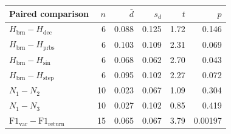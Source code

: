 \begin{tabular}{lrrrrr}
\toprule
Paired comparison & \(n\) & \(\bar{d}\) & \(s_d\) & \(t\) & \(p\) \\
\midrule
$H_{\mathrm{brn}} - H_{\mathrm{dec}}$ & 6 & 0.088 & 0.125 & 1.72 & 0.146 \\
$H_{\mathrm{brn}} - H_{\mathrm{prbs}}$ & 6 & 0.103 & 0.109 & 2.31 & 0.069 \\
$H_{\mathrm{brn}} - H_{\mathrm{sin}}$ & 6 & 0.068 & 0.062 & 2.70 & 0.043 \\
$H_{\mathrm{brn}} - H_{\mathrm{step}}$ & 6 & 0.095 & 0.102 & 2.27 & 0.072 \\
$N_1 - N_2$ & 10 & 0.023 & 0.067 & 1.09 & 0.304 \\
$N_1 - N_3$ & 10 & 0.027 & 0.102 & 0.85 & 0.419 \\
$\mathrm{F1}_{\mathrm{var}} - \mathrm{F1}_{\mathrm{return}}$ & 15 & 0.065 & 0.067 & 3.79 & 0.00197 \\
\bottomrule
\end{tabular}
